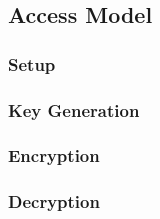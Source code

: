 \subsection{Access Model}


\subsubsection{Setup}


\subsubsection{Key Generation}
\subsubsection{Encryption}
\subsubsection{Decryption}
